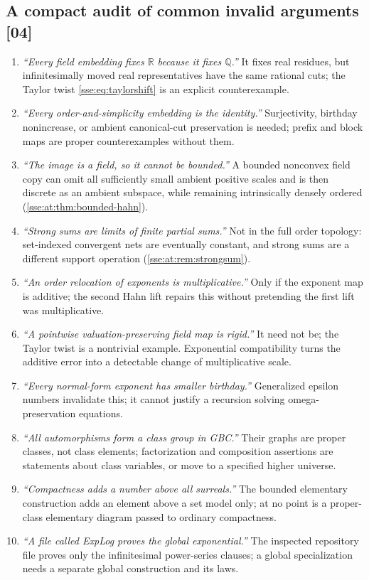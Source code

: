 \documentclass[11pt,a4paper]{article}
\numberwithin{equation}{section}
\theoremstyle{plain}
\theoremstyle{definition}
\theoremstyle{remark}
\newcommand{\R}{\mathbb{R}}
\newcommand{\Q}{\mathbb{Q}}
\newcommand{\src}[1]{\textup{\textsf{\small[#1]}}}%
\begin{document}
\subsection{A compact audit of common invalid arguments \src{04}}\label{sse:at:sec:audit}
\begin{enumerate}[label=(\arabic*)]
\item \emph{``Every field embedding fixes $\R$ because it fixes $\Q$.''} It fixes
real residues, but infinitesimally moved real representatives have the same
rational cuts; the Taylor twist \eqref{sse:eq:taylorshift} is an explicit
counterexample.
\item \emph{``Every order-and-simplicity embedding is the identity.''}
Surjectivity, birthday nonincrease, or ambient canonical-cut preservation is
needed; prefix and block maps are proper counterexamples without them.
\item \emph{``The image is a field, so it cannot be bounded.''} A bounded
nonconvex field copy can omit all sufficiently small ambient positive scales
and is then discrete as an ambient subspace, while remaining intrinsically
densely ordered (\cref{sse:at:thm:bounded-hahn}).
\item \emph{``Strong sums are limits of finite partial sums.''} Not in the full
order topology: set-indexed convergent nets are eventually constant, and
strong sums are a different support operation (\cref{sse:at:rem:strongsum}).
\item \emph{``An order relocation of exponents is multiplicative.''} Only if
the exponent map is additive; the second Hahn lift repairs this without
pretending the first lift was multiplicative.
\item \emph{``A pointwise valuation-preserving field map is rigid.''} It need
not be; the Taylor twist is a nontrivial example. Exponential compatibility
turns the additive error into a detectable change of multiplicative scale.
\item \emph{``Every normal-form exponent has smaller birthday.''} Generalized
epsilon numbers invalidate this; it cannot justify a recursion solving
omega-preservation equations.
\item \emph{``All automorphisms form a class group in GBC.''} Their graphs are
proper classes, not class elements; factorization and composition assertions
are statements about class variables, or move to a specified higher universe.
\item \emph{``Compactness adds a number above all surreals.''} The bounded
elementary construction adds an element above a set model only; at no point
is a proper-class elementary diagram passed to ordinary compactness.
\item \emph{``A file called ExpLog proves the global exponential.''} The
inspected repository file proves only the infinitesimal power-series clauses;
a global specialization needs a separate global construction and its laws.
\end{enumerate}
\end{document}
